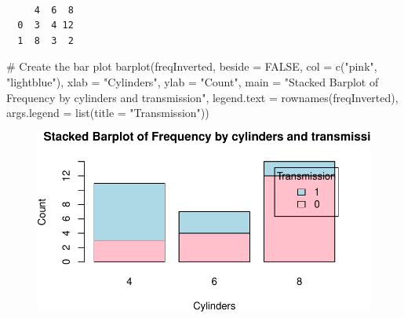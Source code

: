 \documentclass[
  letterpaper,
  DIV=11,
  numbers=noendperiod]{scrreport}
\newenvironment{Shaded}{\begin{snugshade}}{\end{snugshade}}
\newcommand{\AttributeTok}[1]{\textcolor[rgb]{0.40,0.45,0.13}{#1}}
\newcommand{\CommentTok}[1]{\textcolor[rgb]{0.37,0.37,0.37}{#1}}
\newcommand{\ConstantTok}[1]{\textcolor[rgb]{0.56,0.35,0.01}{#1}}
\newcommand{\FunctionTok}[1]{\textcolor[rgb]{0.28,0.35,0.67}{#1}}
\newcommand{\NormalTok}[1]{\textcolor[rgb]{0.00,0.23,0.31}{#1}}
\newcommand{\OtherTok}[1]{\textcolor[rgb]{0.00,0.23,0.31}{#1}}
\newcommand{\SpecialCharTok}[1]{\textcolor[rgb]{0.37,0.37,0.37}{#1}}
\newcommand{\StringTok}[1]{\textcolor[rgb]{0.13,0.47,0.30}{#1}}
\begin{document}
\begin{Shaded}
\end{Shaded}

\begin{verbatim}
   
     4  6  8
  0  3  4 12
  1  8  3  2
\end{verbatim}

\begin{Shaded}
\begin{Highlighting}[]
\CommentTok{\# Create the bar plot}
\FunctionTok{barplot}\NormalTok{(freqInverted, }
        \AttributeTok{beside =} \ConstantTok{FALSE}\NormalTok{, }
        \AttributeTok{col =} \FunctionTok{c}\NormalTok{(}\StringTok{"pink"}\NormalTok{, }\StringTok{"lightblue"}\NormalTok{), }
        \AttributeTok{xlab =} \StringTok{"Cylinders"}\NormalTok{, }\AttributeTok{ylab =} \StringTok{"Count"}\NormalTok{, }
        \AttributeTok{main =} \StringTok{"Stacked Barplot of Frequency by cylinders and transmission"}\NormalTok{, }
        \AttributeTok{legend.text =} \FunctionTok{rownames}\NormalTok{(freqInverted), }
        \AttributeTok{args.legend =} \FunctionTok{list}\NormalTok{(}\AttributeTok{title =} \StringTok{"Transmission"}\NormalTok{))}
\end{Highlighting}
\end{Shaded}

\begin{figure}[H]

{\centering \includegraphics{08CategoricalData02_files/figure-pdf/unnamed-chunk-19-1.pdf}

}

\end{figure}
\end{document}
